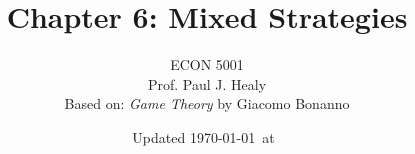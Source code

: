 

\title[Mixed Strategies]{Chapter 6: Mixed Strategies}
\author[ECON 5001]{ECON 5001\\Prof. Paul J. Healy\\Based on: \textit{Game Theory} by Giacomo Bonanno} \color{metrop}
\institute[OSU]{}
\date[]{\vfill {\tiny Updated \today\ at\ \DTMcurrenttime}}

%

